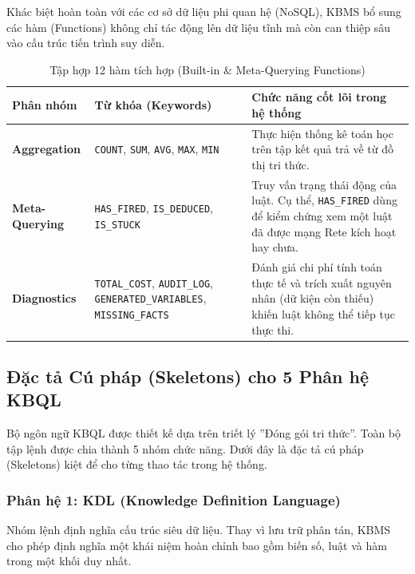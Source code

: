 \documentclass[13pt,a4paper,oneside]{extreport}
\begin{document}
Khác biệt hoàn toàn với các cơ sở dữ liệu phi quan hệ (NoSQL), KBMS bổ sung các hàm (Functions) không chỉ tác động lên dữ liệu tĩnh mà còn can thiệp sâu vào cấu trúc tiến trình suy diễn.



\begin{table}[H]
  \centering\captionsetup{position=below}\small\selectfont
  \begin{tabularx}{\textwidth}{|l|X|X|}
  \hline
Phân nhóm & Từ khóa (Keywords) & Chức năng cốt lõi trong hệ thống \\ \hline
\textbf{Aggregation} & \texttt{COUNT}, \texttt{SUM}, \texttt{AVG}, \texttt{MAX}, \texttt{MIN} & Thực hiện thống kê toán học trên tập kết quả trả về từ đồ thị tri thức. \\ \hline
\textbf{Meta-Querying} & \texttt{HAS\_FIRED}, \texttt{IS\_DEDUCED}, \texttt{IS\_STUCK} & Truy vấn trạng thái động của luật. Cụ thể, \texttt{HAS\_FIRED} dùng để kiểm chứng xem một luật đã được mạng Rete kích hoạt hay chưa. \\ \hline
\textbf{Diagnostics} & \texttt{TOTAL\_COST}, \texttt{AUDIT\_LOG}, \texttt{GENERATED\_VARIABLES}, \texttt{MISSING\_FACTS} & Đánh giá chi phí tính toán thực tế và trích xuất nguyên nhân (dữ kiện còn thiếu) khiến luật không thể tiếp tục thực thi. \\ \hline
  \end{tabularx}
  \caption{Tập hợp 12 hàm tích hợp (Built-in \& Meta-Querying Functions)}\label{tbl:tập-hợp-12-hàm-tích-hợp-built-in-meta-querying-fun}
\end{table}


\subsection{Đặc tả Cú pháp (Skeletons) cho 5 Phân hệ KBQL}


Bộ ngôn ngữ KBQL được thiết kế dựa trên triết lý ''Đóng gói tri thức''. Toàn bộ tập lệnh được chia thành 5 nhóm chức năng. Dưới đây là đặc tả cú pháp (Skeletons) kiệt để cho từng thao tác trong hệ thống.


\subsubsection{Phân hệ 1: KDL (Knowledge Definition Language)}

Nhóm lệnh định nghĩa cấu trúc siêu dữ liệu. Thay vì lưu trữ phân tán, KBMS cho phép định nghĩa một khái niệm hoàn chỉnh bao gồm biến số, luật và hàm trong một khối duy nhất.
\end{document}
